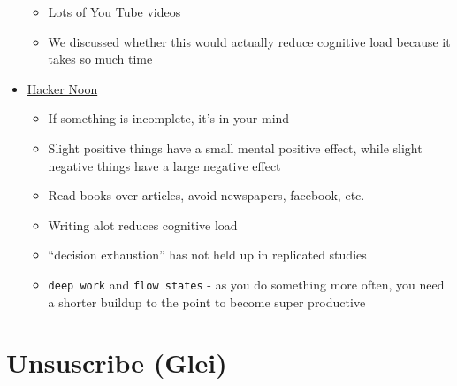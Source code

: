 \documentclass[
  letterpaper,
  DIV=11,
  numbers=noendperiod]{scrreprt}
\begin{document}
\begin{itemize}
  \begin{itemize}
  \item
    Lots of You Tube videos
  \item
    We discussed whether this would actually reduce cognitive load
    because it takes so much time
  \end{itemize}
\item
  \href{https://hackernoon.com/minimizing-the-cognitive-load-in-your-life-bc14f4309fb2}{Hacker
  Noon}

  \begin{itemize}
  \item
    If something is incomplete, it's in your mind
  \item
    Slight positive things have a small mental positive effect, while
    slight negative things have a large negative effect
  \item
    Read books over articles, avoid newspapers, facebook, etc.
  \item
    Writing alot reduces cognitive load
  \item
    ``decision exhaustion'' has not held up in replicated studies
  \item
    \texttt{deep\ work} and \texttt{flow\ states} - as you do something
    more often, you need a shorter buildup to the point to become super
    productive
  \end{itemize}
\end{itemize}

\hypertarget{unsuscribe-glei}{%
\section*{\texorpdfstring{\textbf{Unsuscribe
(Glei)}}{Unsuscribe (Glei)}}\label{unsuscribe-glei}}
\end{document}
